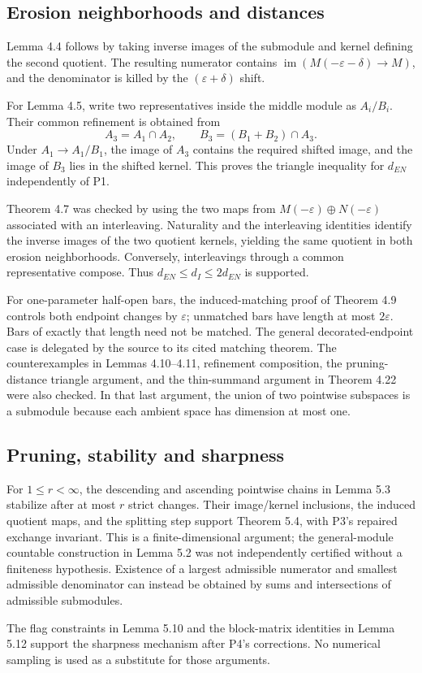 \documentclass[10pt]{article}
\begin{document}
\subsection*{Erosion neighborhoods and distances}
Lemma 4.4 follows by taking inverse images of the submodule and kernel defining the second quotient. The resulting numerator contains \(\operatorname{im}(M(-\varepsilon-\delta)\to M)\), and the denominator is killed by the \((\varepsilon+\delta)\) shift.\par
For Lemma 4.5, write two representatives inside the middle module as \(A_i/B_i\). Their common refinement is obtained from \[A_3=A_1\cap A_2,\qquad B_3=(B_1+B_2)\cap A_3.\] Under \(A_1\to A_1/B_1\), the image of \(A_3\) contains the required shifted image, and the image of \(B_3\) lies in the shifted kernel. This proves the triangle inequality for \(d_{EN}\) independently of P1.\par
Theorem 4.7 was checked by using the two maps from \(M(-\varepsilon)\oplus N(-\varepsilon)\) associated with an interleaving. Naturality and the interleaving identities identify the inverse images of the two quotient kernels, yielding the same quotient in both erosion neighborhoods. Conversely, interleavings through a common representative compose. Thus \(d_{EN}\leq d_I\leq2d_{EN}\) is supported.\par
For one-parameter half-open bars, the induced-matching proof of Theorem 4.9 controls both endpoint changes by \(\varepsilon\); unmatched bars have length at most \(2\varepsilon\). Bars of exactly that length need not be matched. The general decorated-endpoint case is delegated by the source to its cited matching theorem. The counterexamples in Lemmas 4.10–4.11, refinement composition, the pruning-distance triangle argument, and the thin-summand argument in Theorem 4.22 were also checked. In that last argument, the union of two pointwise subspaces is a submodule because each ambient space has dimension at most one.\par
\subsection*{Pruning, stability and sharpness}
For \(1\leq r<\infty\), the descending and ascending pointwise chains in Lemma 5.3 stabilize after at most \(r\) strict changes. Their image/kernel inclusions, the induced quotient maps, and the splitting step support Theorem 5.4, with P3’s repaired exchange invariant. This is a finite-dimensional argument; the general-module countable construction in Lemma 5.2 was not independently certified without a finiteness hypothesis. Existence of a largest admissible numerator and smallest admissible denominator can instead be obtained by sums and intersections of admissible submodules.\par
The flag constraints in Lemma 5.10 and the block-matrix identities in Lemma 5.12 support the sharpness mechanism after P4’s corrections. No numerical sampling is used as a substitute for those arguments.\par
\end{document}
